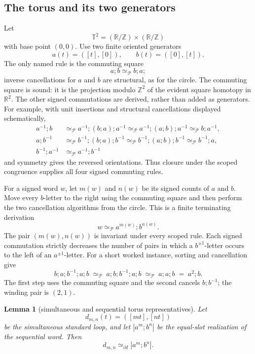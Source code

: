 \documentclass[10pt,reqno]{amsart}
\theoremstyle{definition}
\theoremstyle{plain}
\newtheorem{lemma}[definition]{Lemma}
\theoremstyle{remark}
\newcommand{\RwEq}{\mathrel{\simeq_{\!\mathcal P}}}
\begin{document}
\subsection{The torus and its two generators}

Let
\[
  \mathbb T^2=(\mathbb R/\mathbb Z)\times(\mathbb R/\mathbb Z)
\]
with base point $(0,0)$.  Use two finite oriented generators
\[
  a(t)=([t],[0]),
  \qquad b(t)=([0],[t]).
\]
The only named rule is the commuting square
\[
  a;b\RwEq b;a;
\]
inverse cancellations for $a$ and $b$ are structural, as for the circle.
The commuting square is sound: it is the projection modulo $\mathbb Z^2$ of
the evident square homotopy in $\mathbb R^2$.  The other signed commutations
are derived, rather than added as generators.  For example, with unit
insertions and structural cancellations displayed schematically,
\[
\begin{aligned}
a^{-1};b
  &\RwEq a^{-1};(b;a);a^{-1}
   \RwEq a^{-1};(a;b);a^{-1}
   \RwEq b;a^{-1},\\
a;b^{-1}
  &\RwEq b^{-1};(b;a);b^{-1}
   \RwEq b^{-1};(a;b);b^{-1}
   \RwEq b^{-1};a,\\
b^{-1};a^{-1}
  &\RwEq a^{-1};b^{-1}
\end{aligned}
\]
and symmetry gives the reversed orientations.  Thus closure under the
scoped congruence supplies all four signed commuting rules.

For a signed word $w$, let $m(w)$ and $n(w)$ be its signed counts of $a$ and
$b$.  Move every $b$-letter to the right using the commuting square and then
perform the two cancellation algorithms from the circle.  This is a finite
terminating derivation
\[
  w\RwEq a^{m(w)};b^{n(w)}.
\]
The pair $(m(w),n(w))$ is invariant under every scoped rule.
Each signed commutation strictly decreases the number of pairs in which a
$b^{\pm1}$-letter occurs to the left of an $a^{\pm1}$-letter.
For a short worked instance, sorting and cancellation give
\[
  b;a;b^{-1};a;b
  \;\RwEq\;a;b;b^{-1};a;b
    \;\RwEq\;a;a;b
  \;=\;a^2;b.
\]
The first step uses the commuting square and the second cancels $b;b^{-1}$;
the winding pair is $(2,1)$.

\begin{lemma}[simultaneous and sequential torus representatives]
\label{lem:torus-sequential}
Let
\[
  d_{m,n}(t)=([mt],[nt])
\]
be the simultaneous standard loop, and let $|a^m;b^n|$ be the equal-slot
realization of the sequential word.  Then
\[
  d_{m,n}\simeq_{\partial I}|a^m;b^n|.
\]
\end{lemma}
\end{document}
